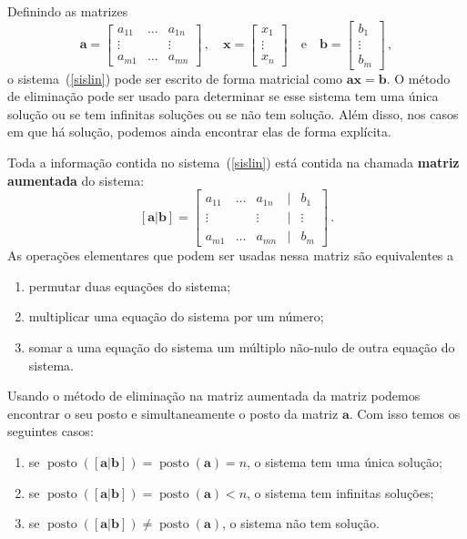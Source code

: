 \documentclass[12pt,a4paper]{report}
\newcommand{\tb}{\textbf}
\newcommand{\mb}{\mathbf}
\DeclareMathOperator{\posto}{posto}
\begin{document}
Definindo as matrizes
$$\mb a=\begin{bmatrix}
  a_{11}&\ldots&a_{1n}\\
  \vdots&&\vdots\\
  a_{m1}&\ldots&a_{mn}
\end{bmatrix}\,,\quad \mb x=\begin{bmatrix}
  x_1\\
  \vdots\\
  x_n
\end{bmatrix}\quad \text{e}\quad \mb b=\begin{bmatrix}
  b_1\\
  \vdots\\
  b_m
\end{bmatrix}\,,$$
o sistema~(\ref{sislin}) pode ser escrito de forma matricial como $\mb a\mb x=\mb b$. O método de eliminação pode ser usado para determinar se esse sistema tem uma única solução ou se tem infinitas soluções ou se não tem solução. Além disso, nos casos em que há solução, podemos ainda encontrar elas de forma explícita.

Toda a informação contida no sistema~(\ref{sislin}) está contida na chamada \tb{matriz aumentada} do sistema:
$$[\mb a|\mb b]=\begin{bmatrix}
  a_{11}&\ldots&a_{1n}&|&b_1\\
  \vdots&&\vdots&|&\vdots\\
  a_{m1}&\ldots&a_{mn}&|&b_m
\end{bmatrix}\,.$$
As operações elementares que podem ser usadas nessa matriz são equivalentes a
\begin{enumerate}
  \item permutar duas equações do sistema;
  \item multiplicar uma equação do sistema por um número;
  \item somar a uma equação do sistema um múltiplo não-nulo de outra equação do sistema.
\end{enumerate}
Usando o método de eliminação na matriz aumentada da matriz podemos encontrar o seu posto e simultaneamente o posto da matriz $\mb a$. Com isso temos os seguintes casos:
\begin{enumerate}
  \item se $\posto([\mb a|\mb b])=\posto(\mb a)=n$, o sistema tem uma única solução;
  \item se $\posto([\mb a|\mb b])=\posto(\mb a)<n$, o sistema tem infinitas soluções;
  \item se $\posto([\mb a|\mb b])\ne\posto(\mb a)$, o sistema não tem solução.
\end{enumerate}
\end{document}
